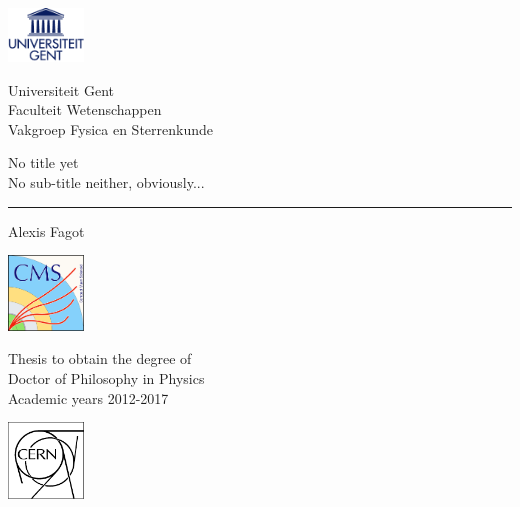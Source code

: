 \documentclass[10pt,a4paper,twoside,dutch,english]{book}                %
\begin{document}
\latintext
\graphicspath{{fig/}}

% 
 \thispagestyle{empty}   %
% 
 \noindent
 \begin{minipage}{3cm}%
   \includegraphics*[width=2cm]{UGentlogo}%
 \end{minipage}\hfill
 \begin{minipage}{8cm}
 \raggedleft
 \textsf{Universiteit Gent\\
 Faculteit Wetenschappen\\
 Vakgroep Fysica en Sterrenkunde}
 \end{minipage}
% 
\bigskip
   \begin{flushleft}
     \Large \textsf{No title yet}\\
     \vspace{0.1in}\large{\textsf{No sub-title neither, obviously...}}%
   \end{flushleft}
 \hrule
% 
 \bigskip
   \LARGE\noindent \textsf{Alexis Fagot} \hfill
 \bigskip
% 
% 
 \normalsize
% 
 \vfill
 \begin{minipage}{2.0cm}%
     \includegraphics*[width=2.0cm]{CMS}%
 \end{minipage}\hfill
 \begin{minipage}{6cm}
 \centering
 \textsf{Thesis to obtain the degree of\\
 Doctor of Philosophy in Physics\\
 Academic years 2012-2017}
 \end{minipage}\hfill
 \begin{minipage}{2.0cm}%
     \includegraphics*[width=2.0cm]{CERN}%
 \end{minipage}\hfill
\end{document}
